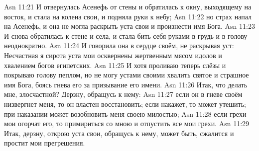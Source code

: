 \vs Asn 11:21
И отвернулась Асенефь от стены
и обратилась к окну,
выходящему на восток, и стала на колена свои,
и подняла руки к небу;
\vs Asn 11:22
но страх напал на Асенефь,
и она не могла раскрыть уста свои и произнести имя Бога.
\vs Asn 11:23
И снова обратилась к стене
и села, и стала бить себя руками
в грудь и в голову неоднократно.
\vs Asn 11:24
И говорила она в сердце своём,
не раскрывая уст:
Несчастная я сирота уста мои осквернены жертвенным
мясом идолов и хвалением богов египетских.
\vs Asn 11:25
И хотя проливаю теперь слёзы
и покрываю голову пеплом,
но не могу устами своими хвалить
святое и страшное имя Бога,
боясь гнева его за призывание его имени.
\vs Asn 11:26
Итак, что делать мне, злосчастной?
Дерзну, обращусь к нему:
\vs Asn 11:27
если он в гневе своём низвергнет меня,
то он властен восстановить; если накажет, то может утешить;
при наказании может возобновить меня своею милостью;
\vs Asn 11:28
если грехи мои огорчат его,
то примириться со мною и отпустить все мои грехи.
\vs Asn 11:29
Итак, дерзну, открою уста свои,
обращусь к нему, может быть, сжалится и простит мои прегрешения.

